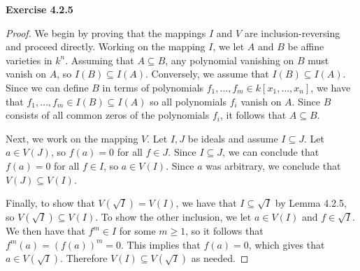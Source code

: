 \documentclass[12pt,oneside]{article}
\newenvironment{exercise}[1]{\vspace{.1in}\noindent\textbf{Exercise #1 \hspace{.05em}}}{}
\begin{document}

\begin{exercise}{4.2.5}
    \begin{proof}
        We begin by proving that the mappings $I$ and $V$ are inclusion-reversing and 
        proceed directly. Working on the mapping $I$, we let $A$ and $B$ be affine varieties 
        in $k^n$. Assuming that $A \subseteq B$, any polynomial vanishing on $B$ must 
        vanish on $A$, so $I(B) \subseteq I(A)$. Conversely, we assume that 
        $I(B) \subseteq I(A)$. Since we can define $B$ in terms of polynomials 
        $f_1,\ldots,f_m \in k[x_1,\ldots,x_n]$, we have that 
        $f_1,\ldots,f_m \in I(B) \subseteq I(A)$ so all polynomials $f_i$ vanish on $A$. 
        Since $B$ consists of all common zeros of the polynomials $f_i$, it follows that 
        $A \subseteq B$.
        
        Next, we work on the mapping $V$. Let $I, J$ be ideals and assume $I \subseteq J$.
        Let $a \in V(J)$, so $f(a) = 0$ for all $f \in J$. Since $I \subseteq J$, we can 
        conclude that $f(a) = 0$ for all $f \in I$, so $a \in V(I)$. Since $a$ was
        arbitrary, we conclude that $V(J) \subseteq V(I)$. 
        
        Finally, to show that $V(\sqrt{I}) = V(I)$, we have that $I \subseteq \sqrt{I}$ by 
        Lemma 4.2.5, so $V(\sqrt{I}) \subseteq V(I)$. To show the other inclusion, we let 
        $a \in V(I)$ and $f \in \sqrt{I}$. We then have that $f^m \in I$ for some $m \geq1$,
        so it follows that $f^m(a) = (f(a))^m = 0$. This implies that $f(a) = 0$, which
        gives that $a \in V(\sqrt{I})$. Therefore $V(I) \subseteq V(\sqrt{I})$ as needed.
    \end{proof}
\end{exercise}


\end{document}
